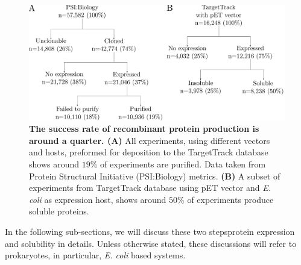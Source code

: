 \begin{figure}[htbp!]
\center
\includegraphics[width=1\textwidth]{chapters/Introduction/Figures/Status_of_protein_expression(2).pdf}
\caption[The success rate of recombinant protein production is around a quarter.]{\textbf{The success rate of recombinant protein production is around a quarter. (A)} All experiments, using different vectors and hosts, preformed for deposition to the TargetTrack database shows around $19\%$ of experiments are purified. Data taken from Protein Structural Initiative (PSI:Biology) metrics. \textbf{(B)} A subset of experiments from TargetTrack database using pET vector and \textit{E. coli} as expression host, shows around $50\%$ of experiments produce soluble proteins. }%
\label{fig:fail_succ}
\end{figure}


In the following sub-sections, we will discuss these two steps\textemdash protein expression and solubility in details. Unless otherwise stated, these discussions will refer to prokaryotes, in particular, \textit{E. coli} based systems. 
















